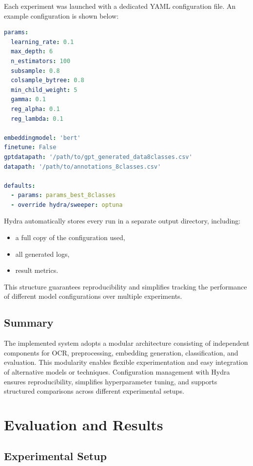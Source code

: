 \documentclass{SGGW-thesis-EN}
\begin{document}
Each experiment was launched with a dedicated YAML configuration file. An example configuration is shown below:

\begin{lstlisting}[language=yaml, caption=Sample Hydra configuration]
params:
  learning_rate: 0.1
  max_depth: 6
  n_estimators: 100
  subsample: 0.8
  colsample_bytree: 0.8
  min_child_weight: 5
  gamma: 0.1
  reg_alpha: 0.1
  reg_lambda: 0.1

embeddingmodel: 'bert'
finetune: False
gptdatapath: '/path/to/gpt_generated_data8classes.csv'
datapath: '/path/to/annotations_8classes.csv'

defaults:
  - params: params_best_8classes
  - override hydra/sweeper: optuna
\end{lstlisting}

Hydra automatically stores every run in a separate output directory, including:
\begin{itemize}
  \item a full copy of the configuration used,
  \item all generated logs,
  \item result metrics.
\end{itemize}

This structure guarantees reproducibility and simplifies tracking the performance of different model configurations over multiple experiments.

\section{Summary}

The implemented system adopts a modular architecture consisting of independent components for OCR, preprocessing,
embedding generation, classification, and evaluation. This modularity enables flexible experimentation and easy
integration of alternative models or techniques. Configuration management with Hydra ensures reproducibility,
simplifies hyperparameter tuning, and supports structured comparisons across different experimental setups.

\chapter{Evaluation and Results}
\section{Experimental Setup}
\end{document}
